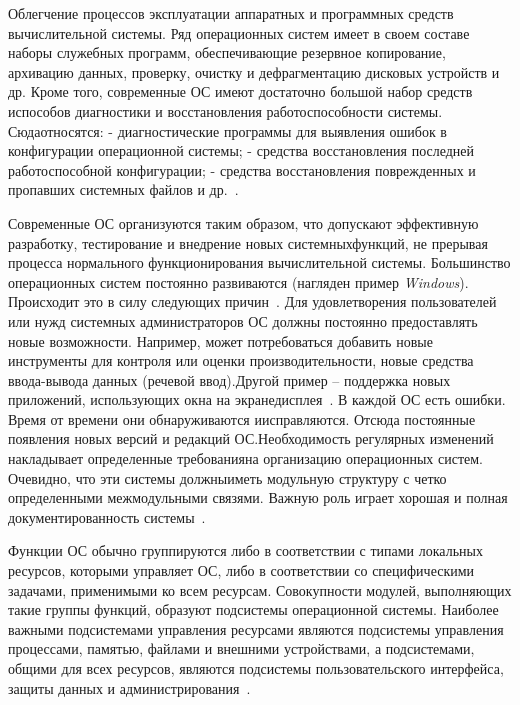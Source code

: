 Облегчение процессов эксплуатации аппаратных и программных средств вычислительной системы. Ряд операционных систем имеет в своем составе наборы   служебных   программ,   обеспечивающие   резервное   копирование, архивацию данных, проверку, очистку и дефрагментацию дисковых устройств и др. Кроме того, современные ОС имеют достаточно большой набор средств испособов диагностики и восстановления работоспособности системы. Сюдаотносятся: - диагностические программы для выявления ошибок в конфигурации операционной системы; - средства восстановления последней работоспособной конфигурации; - средства   восстановления   поврежденных   и   пропавших   системных файлов и др.~\cite{Oc1}.

Современные   ОС   организуются   таким   образом,   что   допускают эффективную   разработку,   тестирование   и   внедрение   новых   системныхфункций,   не   прерывая   процесса   нормального   функционирования вычислительной   системы.   Большинство   операционных   систем   постоянно развиваются (нагляден пример \textit{Windows}). Происходит это в силу следующих причин~\cite{Oc1}. Для удовлетворения пользователей или нужд системных администраторов ОС должны постоянно предоставлять новые возможности. Например, может потребоваться   добавить   новые   инструменты   для   контроля   или   оценки производительности,   новые   средства   ввода-вывода   данных   (речевой   ввод).Другой пример – поддержка новых приложений, использующих окна на экранедисплея~\cite{Oc1}. В каждой ОС есть ошибки. Время от времени они обнаруживаются иисправляются. Отсюда постоянные появления новых версий и редакций ОС.Необходимость регулярных изменений накладывает определенные требованияна организацию операционных систем. Очевидно, что эти системы должныиметь модульную структуру с четко определенными межмодульными связями. Важную роль играет хорошая и полная документированность системы~\cite{Oc1}.

Функции   ОС   обычно   группируются   либо   в   соответствии   с   типами локальных   ресурсов,   которыми   управляет   ОС,   либо   в   соответствии   со специфическими задачами, применимыми ко всем ресурсам. Совокупности модулей,   выполняющих   такие   группы   функций,   образуют   подсистемы операционной   системы.   Наиболее   важными   подсистемами   управления ресурсами являются подсистемы управления процессами, памятью, файлами и внешними устройствами, а подсистемами, общими для всех ресурсов, являются подсистемы   пользовательского   интерфейса,   защиты   данных   и администрирования~\cite{Oc2}.

